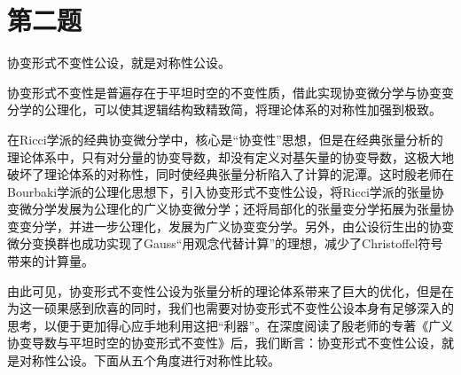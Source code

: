 \documentclass[UTF8]{ctexart}
\begin{document}
\section{第二题}
\begin{center}
\fontsize{18pt}{18pt}\selectfont
协变形式不变性公设，就是对称性公设。
\end{center}
\par
协变形式不变性是普遍存在于平坦时空的不变性质，借此实现协变微分学与协变变分学的公理化，可以使其逻辑结构致精致简，将理论体系的对称性加强到极致。\par
在Ricci学派的经典协变微分学中，核心是“协变性”思想，但是在经典张量分析的理论体系中，只有对分量的协变导数，却没有定义对基矢量的协变导数，这极大地破坏了理论体系的对称性，同时使经典张量分析陷入了计算的泥潭。这时殷老师在Bourbaki学派的公理化思想下，引入协变形式不变性公设，将Ricci学派的张量协变微分学发展为公理化的广义协变微分学；还将局部化的张量变分学拓展为张量协变变分学，并进一步公理化，发展为广义协变变分学。另外，由公设衍生出的协变微分变换群也成功实现了Gauss“用观念代替计算”的理想，减少了Christoffel符号带来的计算量。\par
由此可见，协变形式不变性公设为张量分析的理论体系带来了巨大的优化，但是在为这一硕果感到欣喜的同时，我们也需要对协变形式不变性公设本身有足够深入的思考，以便于更加得心应手地利用这把“利器”。在深度阅读了殷老师的专著《广义协变导数与平坦时空的协变形式不变性》后，我们断言：协变形式不变性公设，就是对称性公设。下面从五个角度进行对称性比较。\par
\end{document}

